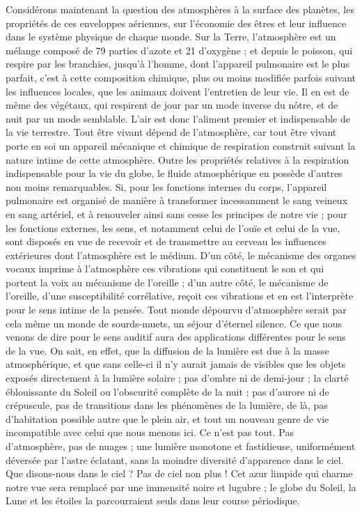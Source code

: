 \documentclass[a4paper, 11pt, oneside, landscape]{article}
\begin{document}
Considérons maintenant la question des atmosphères à la surface des planètes, les propriétés de ces enveloppes aériennes, sur l'économie des êtres et leur influence dans le système physique de chaque monde. Sur la Terre, l'atmosphère est un mélange composé de 79 parties d'azote et 21 d'oxygène ; et depuis le poisson, qui respire par les branchies, jusqu'à l'homme, dont l'appareil pulmonaire est le plus parfait, c'est à cette composition chimique, plus ou moins modifiée parfois suivant les influences locales, que les animaux doivent l'entretien de leur vie. Il en est de même des végétaux, qui respirent de jour par un mode inverse du nôtre, et de nuit par un mode semblable. L'air est donc l'aliment premier et indispensable de la vie terrestre. Tout être vivant dépend de l'atmosphère, car tout être vivant porte en soi un appareil mécanique et chimique de respiration construit suivant la nature intime de cette atmosphère. Outre les propriétés relatives à la respiration indispensable pour la vie du globe, le fluide atmosphérique en possède d'autres non moins remarquables. Si, pour les fonctions internes du corps, l'appareil pulmonaire est organisé de manière à transformer incessamment le sang veineux en sang artériel, et à renouveler ainsi sans cesse les principes de notre vie ; pour les fonctions externes, les sens, et notamment celui de l'ouïe et celui de la vue, sont disposés en vue de recevoir et de transmettre au cerveau les influences extérieures dont l'atmosphère est le médium. D'un côté, le mécanisme des organes vocaux imprime à l'atmosphère ces vibrations qui constituent le son et qui portent la voix au mécanisme de l'oreille ; d'un autre côté, le mécanisme de l'oreille, d'une susceptibilité corrélative, reçoit ces vibrations et en est l'interprète pour le sens intime de la pensée. Tout monde dépourvu d'atmosphère serait par cela même un monde de sourds-muets, un séjour d'éternel silence. Ce que nous venons de dire pour le sens auditif aura des applications différentes pour le sens de la vue. On sait, en effet, que la diffusion de la lumière est due à la masse atmosphérique, et que sans celle-ci il n'y aurait jamais de visibles que les objets exposés directement à la lumière solaire ; pas d'ombre ni de demi-jour ; la clarté éblouissante du Soleil ou l'obscurité complète de la nuit ; pas d'aurore ni de crépuscule, pas de transitions dans les phénomènes de la lumière, de là, pas d'habitation possible autre que le plein air, et tout un nouveau genre de vie incompatible avec celui que nous menons ici. Ce n'est pas tout. Pas d'atmosphère, pas de nuages ; une lumière monotone et fastidieuse, uniformément déversée par l'astre éclatant, sans la moindre diversité d'apparence dans le ciel. Que disons-nous dans le ciel ? Pas de ciel non plus ! Cet azur limpide qui charme notre vue sera remplacé par une immensité noire et lugubre ; le globe du Soleil, la Lune et les étoiles la parcourraient seuls dans leur course périodique.
\end{document}
